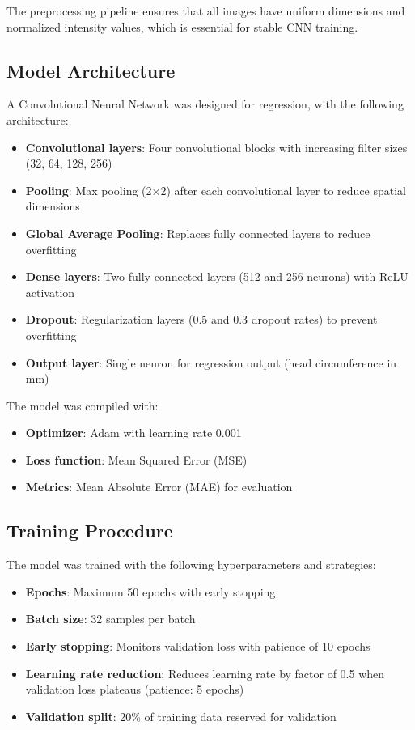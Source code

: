 \documentclass[conference]{IEEEtran}
\begin{document}
The preprocessing pipeline ensures that all images have uniform dimensions and normalized intensity values, which is essential for stable CNN training.

\subsection{Model Architecture}

A Convolutional Neural Network was designed for regression, with the following architecture:

\begin{itemize}
    \item \textbf{Convolutional layers}: Four convolutional blocks with increasing filter sizes (32, 64, 128, 256)
    \item \textbf{Pooling}: Max pooling (2×2) after each convolutional layer to reduce spatial dimensions
    \item \textbf{Global Average Pooling}: Replaces fully connected layers to reduce overfitting
    \item \textbf{Dense layers}: Two fully connected layers (512 and 256 neurons) with ReLU activation
    \item \textbf{Dropout}: Regularization layers (0.5 and 0.3 dropout rates) to prevent overfitting
    \item \textbf{Output layer}: Single neuron for regression output (head circumference in mm)
\end{itemize}

The model was compiled with:
\begin{itemize}
    \item \textbf{Optimizer}: Adam with learning rate 0.001
    \item \textbf{Loss function}: Mean Squared Error (MSE)
    \item \textbf{Metrics}: Mean Absolute Error (MAE) for evaluation
\end{itemize}

\subsection{Training Procedure}

The model was trained with the following hyperparameters and strategies:
\begin{itemize}
    \item \textbf{Epochs}: Maximum 50 epochs with early stopping
    \item \textbf{Batch size}: 32 samples per batch
    \item \textbf{Early stopping}: Monitors validation loss with patience of 10 epochs
    \item \textbf{Learning rate reduction}: Reduces learning rate by factor of 0.5 when validation loss plateaus (patience: 5 epochs)
    \item \textbf{Validation split}: 20\% of training data reserved for validation
\end{itemize}
\end{document}
